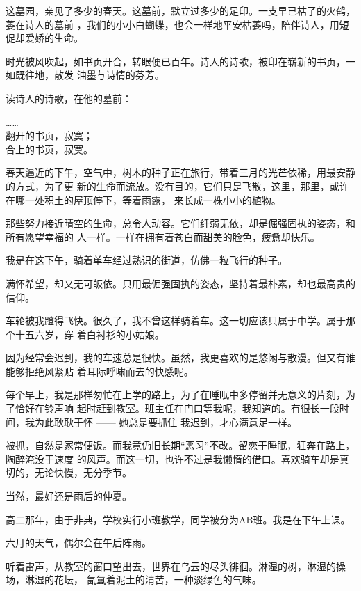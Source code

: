 \documentclass[12pt,a4paper]{article}
\begin{document}
		这墓园，亲见了多少的春天。这墓前，默立过多少的足印。一支早已枯了的火鹤，萎在诗人的墓前
	，我们的小小白蝴蝶，也会一样地平安枯萎吗，陪伴诗人，用短促却爱娇的生命。


		时光被风吹起，如书页开合，转眼便已百年。诗人的诗歌，被印在崭新的书页，一如既往地，散发
	油墨与诗情的芬芳。

		读诗人的诗歌，在他的墓前：

		\longpoem{}{}{}
		…… \\
		翻开的书页，寂寞；\\
		合上的书页，寂寞。
		\endlongpoem

	\endwriting



		春天逼近的下午，空气中，树木的种子正在旅行，带着三月的光芒依稀，用最安静的方式，为了更
	新的生命而流放。没有目的，它们只是飞散，这里，那里，或许在哪一处积土的屋顶停下，等着雨露，
	来长成一株小小的植物。

		那些努力接近晴空的生命，总令人动容。它们纤弱无依，却是倔强固执的姿态，和所有愿望幸福的
	人一样。一样在拥有着苍白而甜美的脸色，疲惫却快乐。


		我是在这下午，骑着单车经过熟识的街道，仿佛一粒飞行的种子。

		满怀希望，却又无可皈依。只用最倔强固执的姿态，坚持着最朴素，却也最高贵的信仰。


		车轮被我蹬得飞快。很久了，我不曾这样骑着车。这一切应该只属于中学。属于那个十五六岁，穿
	着白衬衫的小姑娘。

		因为经常会迟到，我的车速总是很快。虽然，我更喜欢的是悠闲与散漫。但又有谁能够拒绝风紧贴
	着耳际呼啸而去的快感呢。

		每个早上，我是那样匆忙在上学的路上，为了在睡眠中多停留并无意义的片刻，为了恰好在铃声响
	起时赶到教室。班主任在门口等我呢，我知道的。有很长一段时间，我为此耿耿于怀 —— 她总是要抓住
	我迟到，才心满意足一样。

		被抓，自然是家常便饭。而我竟仍旧长期“恶习”不改。留恋于睡眠，狂奔在路上，陶醉淹没于速度
	的风声。而这一切，也许不过是我懒惰的借口。喜欢骑车却是真切的，无论快慢，无分季节。


		当然，最好还是雨后的仲夏。


		高二那年，由于非典，学校实行小班教学，同学被分为AB班。我是在下午上课。

		六月的天气，偶尔会在午后阵雨。

		听着雷声，从教室的窗口望出去，世界在乌云的尽头徘徊。淋湿的树，淋湿的操场，淋湿的花坛，
	氤氲着泥土的清苦，一种淡绿色的气味。
\end{document}
